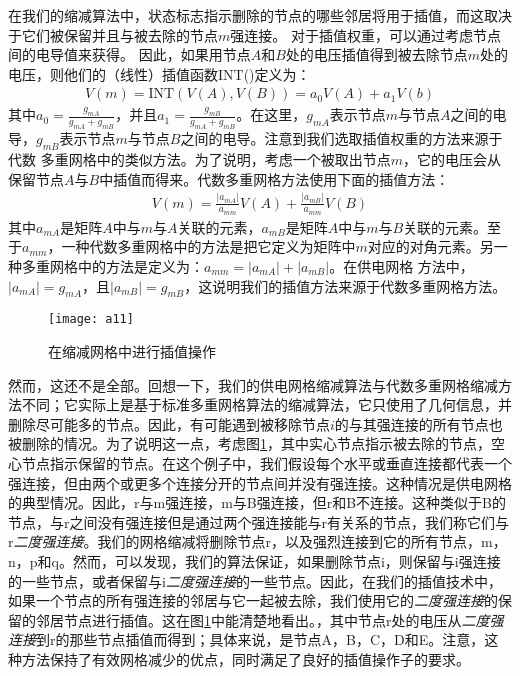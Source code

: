 在我们的缩减算法中，状态标志指示删除的节点的哪些邻居将用于插值，而这取决于它们被保留并且与被去除的节点$m$强连接。 对于插值权重，可以通过考虑节点间的电导值来获得。 因此，如果用节点$A$和$B$处的电压插值得到被去除节点$m$处的电压，则他们的（线性）插值函数INT()定义为：
\begin{align}
V(m)=\text{INT}(V(A),V(B))=a_0V(A)+a_1V(b)
\end{align}
其中$a_0=\frac{g_{mA}}{g_{mA}+g_{mB}}$，并且$a_1=\frac{g_{mB}}{g_{mA}+g_{mB}}$。在这里，$g_{mA}$表示节点$m$与节点$A$之间的电导，$g_{mB}$表示节点$m$与节点$B$之间的电导。注意到我们选取插值权重的方法来源于代数
多重网格中的类似方法。为了说明，考虑一个被取出节点$m$，它的电压会从保留节点$A$与$B$中插值而得来。代数多重网格方法使用下面的插值方法：
\begin{align}
V(m)=\frac{|a_{mA}|}{a_{mm}}V(A)+\frac{|a_{mB}|}{a_{mm}}V(B)
\end{align}
其中$a_{mA}$是矩阵$A$中与$m$与$A$关联的元素，$a_{mB}$是矩阵$A$中与$m$与$B$关联的元素。至于$a_{mm}$，一种代数多重网格中的方法是把它定义为矩阵中$m$对应的对角元素。另一种多重网格中的方法是定义为：$a_{mm}=|a_{mA}|+|a_{mB}|$。在供电网格
方法中，$|a_{mA}|=g_{mA}$，且$|a_{mB}|=g_{mB}$，这说明我们的插值方法来源于代数多重网格方法。

\begin{figure}[H] %
  \centering
  \texttt{[image: a11]}
  \caption{在缩减网格中进行插值操作}
  \label{fig:a11}
\end{figure}

然而，这还不是全部。回想一下，我们的供电网格缩减算法与代数多重网格缩减方法不同；它实际上是基于标准多重网格算法的缩减算法，它只使用了几何信息，并删除尽可能多的节点。因此，有可能遇到被移除节点$i$的与其强连接的所有节点也被删除的情况。为了说明这一点，考虑图\ref{fig:a11}，其中实心节点指示被去除的节点，空心节点指示保留的节点。在这个例子中，我们假设每个水平或垂直连接都代表一个强连接，但由两个或更多个连接分开的节点间并没有强连接。这种情况是供电网格的典型情况。因此，r与m强连接，m与B强连接，但r和B不连接。这种类似于B的节点，与r之间没有强连接但是通过两个强连接能与r有关系的节点，我们称它们与r\emph{二度强连接}。我们的网格缩减将删除节点r，以及强烈连接到它的所有节点，m，n，p和q。然而，可以发现，我们的算法保证，如果删除节点i，则保留与i强连接的一些节点，或者保留与i\emph{二度强连接}的一些节点。因此，在我们的插值技术中，如果一个节点的所有强连接的邻居与它一起被去除，我们使用它的\emph{二度强连接}的保留的邻居节点进行插值。这在图\ref{fig:a11}中能清楚地看出。，其中节点r处的电压从\emph{二度强连接}到r的那些节点插值而得到；具体来说，是节点A，B，C，D和E。注意，这种方法保持了有效网格减少的优点，同时满足了良好的插值操作子的要求。

